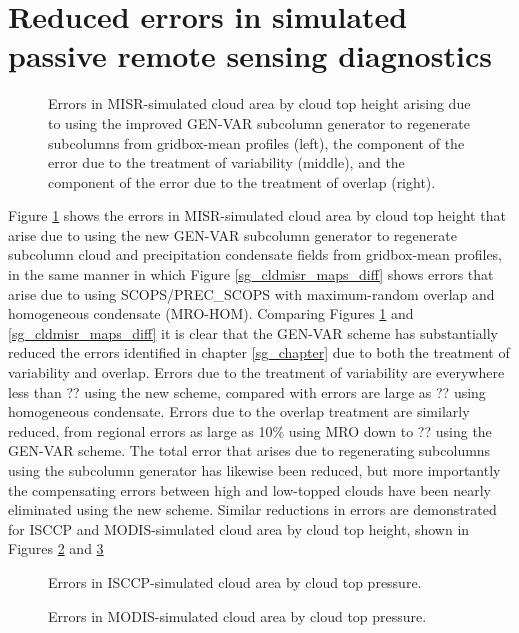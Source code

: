 \section{Reduced errors in simulated passive remote sensing diagnostics}
\label{subgrid2_passive_section}
\begin{figure}
\centering
\caption{Errors in MISR-simulated cloud area by cloud top height arising due to using the improved GEN-VAR subcolumn generator to regenerate subcolumns from gridbox-mean profiles (left), the component of the error due to the treatment of variability (middle), and the component of the error due to the treatment of overlap (right).}
\label{sgi_cldmisr_maps_diff}
\end{figure}
Figure \ref{sgi_cldmisr_maps_diff} shows the errors in MISR-simulated cloud area by cloud top height that arise due to using the new GEN-VAR subcolumn generator to regenerate subcolumn cloud and precipitation condensate fields from gridbox-mean profiles, in the same manner in which Figure \ref{sg_cldmisr_maps_diff} shows errors that arise due to using SCOPS/PREC\_SCOPS with maximum-random overlap and homogeneous condensate (MRO-HOM). Comparing Figures \ref{sgi_cldmisr_maps_diff} and \ref{sg_cldmisr_maps_diff} it is clear that the GEN-VAR scheme has substantially reduced the errors identified in chapter \ref{sg_chapter} due to both the treatment of variability and overlap. Errors due to the treatment of variability are everywhere less than ?? using the new scheme, compared with errors are large as ?? using homogeneous condensate. Errors due to the overlap treatment are similarly reduced, from regional errors as large as 10\% using MRO down to ?? using the GEN-VAR scheme. The total error that arises due to regenerating subcolumns using the subcolumn generator has likewise been reduced, but more importantly the compensating errors between high and low-topped clouds have been nearly eliminated using the new scheme. Similar reductions in errors are demonstrated for ISCCP and MODIS-simulated cloud area by cloud top height, shown in Figures \ref{sgi_cldisccp_maps_diff} and \ref{sgi_cldmodis_maps_diff}

\begin{figure}
\centering
\caption{Errors in ISCCP-simulated cloud area by cloud top pressure.}
\label{sgi_cldisccp_maps_diff}
\end{figure}

\begin{figure}
\centering
\caption{Errors in MODIS-simulated cloud area by cloud top pressure.}
\label{sgi_cldmodis_maps_diff}
\end{figure}

